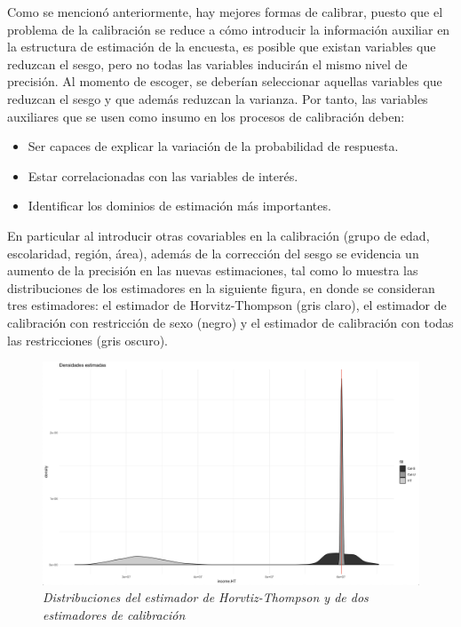 \documentclass[
  10pt,
  spanish,
]{book}
\providecommand{\tightlist}{%
  \setlength{\itemsep}{0pt}\setlength{\parskip}{0pt}}
\begin{document}
Como se mencionó anteriormente, hay mejores formas de calibrar, puesto que el problema de la calibración se reduce a cómo introducir la información auxiliar en la estructura de estimación de la encuesta, es posible que existan variables que reduzcan el sesgo, pero no todas las variables inducirán el mismo nivel de precisión. Al momento de escoger, se deberían seleccionar aquellas variables que reduzcan el sesgo y que además reduzcan la varianza. Por tanto, las variables auxiliares que se usen como insumo en los procesos de calibración deben:

\begin{itemize}
\tightlist
\item
  Ser capaces de explicar la variación de la probabilidad de respuesta.
\item
  Estar correlacionadas con las variables de interés.
\item
  Identificar los dominios de estimación más importantes.
\end{itemize}

En particular al introducir otras covariables en la calibración (grupo de edad, escolaridad, región, área), además de la corrección del sesgo se evidencia un aumento de la precisión en las nuevas estimaciones, tal como lo muestra las distribuciones de los estimadores en la siguiente figura, en donde se consideran tres estimadores: el estimador de Horvitz-Thompson (gris claro), el estimador de calibración con restricción de sexo (negro) y el estimador de calibración con todas las restricciones (gris oscuro).

\begin{figure}
\centering
\includegraphics{Pics/c12.png}
\caption{\emph{Distribuciones del estimador de Horvtiz-Thompson y de dos estimadores de calibración}}
\end{figure}
\end{document}
